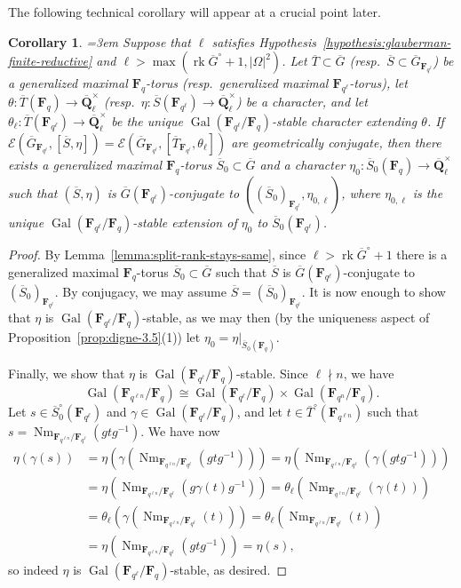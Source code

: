\documentclass[reqno]{amsart}
\numberwithin{equation}{subsection}
\newcommand{\F}{\mathbf{F}}
\newcommand{\Q}{\mathbf{Q}}
\newcommand{\Gal}{\operatorname{Gal}}
\newcommand{\ol}[1]{\overline{#1}}
\newcommand{\co}{\colon}
\newcommand\cE{\mathcal{E}}
\DeclareMathOperator{\Nm}{Nm}
\DeclareMathOperator{\rk}{rk}
\newtheorem{cor}[thm]{Corollary}
\theoremstyle{remark}
\numberwithin{equation}{subsection}
\numberwithin{figure}{subsection}
\begin{document}
The following technical corollary will appear at a crucial point later.

\begin{cor}\label{cor:glauberman-torus-character-conjugate}\emergencystretch=3em
    Suppose that $\ell$ satisfies Hypothesis~\ref{hypothesis:glauberman-finite-reductive} and $\ell > \max(\rk \ol G^\circ + 1, |\Omega|^2)$. Let $\ol T \subset \ol G$ (resp.\ $\ol S \subset \ol G_{\F_{q^\ell}}$) be a generalized maximal $\F_q$-torus (resp.\ generalized maximal $\F_{q^\ell}$-torus), let $\theta\co \ol T(\F_q) \to \ol\Q_\ell^\times$ (resp.\ $\eta\co \ol S(\F_{q^\ell}) \to \ol\Q_\ell^\times$) be a character, and let $\theta_\ell\co \ol T(\F_{q^\ell}) \to \ol\Q_\ell^\times$ be the unique $\Gal(\F_{q^\ell}/\F_q)$-stable character extending $\theta$. If $\cE(\ol G_{\F_{q^\ell}}, [\ol S, \eta]) = \cE(\ol G_{\F_{q^\ell}}, [\ol T_{\F_{q^\ell}}, \theta_\ell])$ are geometrically conjugate, then there exists a generalized maximal $\F_q$-torus $\ol S_0 \subset \ol G$ and a character $\eta_0\co \ol S_0(\F_q) \to \ol\Q_\ell^\times$ such that $(\ol S, \eta)$ is $\ol G(\F_{q^\ell})$-conjugate to $((\ol S_0)_{\F_{q^\ell}}, \eta_{0,\ell})$, where $\eta_{0,\ell}$ is the unique $\Gal(\F_{q^\ell}/\F_q)$-stable extension of $\eta_0$ to $\ol S_0(\F_{q^\ell})$.
\end{cor}

\begin{proof}
    By Lemma~\ref{lemma:split-rank-stays-same}, since $\ell > \rk \ol G^\circ + 1$ there is a generalized maximal $\F_q$-torus $\ol S_0 \subset \ol G$ such that $\ol S$ is $\ol G(\F_{q^\ell})$-conjugate to $(\ol S_0)_{\F_{q^\ell}}$. By conjugacy, we may assume $\ol S = (\ol S_0)_{\F_{q^\ell}}$. It is now enough to show that $\eta$ is $\Gal(\F_{q^\ell}/\F_q)$-stable, as we may then (by the uniqueness aspect of Proposition~\ref{prop:digne-3.5}(1)) let $\eta_0 = \eta|_{\ol S_0(\F_q)}$.

    Finally, we show that $\eta$ is $\Gal(\F_{q^\ell}/\F_q)$-stable. Since $\ell \nmid n$, we have
    \[
    \Gal(\F_{q^{\ell n}}/\F_q) \cong \Gal(\F_{q^\ell}/\F_q) \times \Gal(\F_{q^n}/\F_q).
    \]
    Let $s \in \ol S_0^\circ(\F_{q^\ell})$ and $\gamma \in \Gal(\F_{q^\ell}/\F_q)$, and let $t \in \ol T^\circ(\F_{q^{\ell n}})$ such that $s = \Nm_{\F_{q^{\ell n}}/\F_{q^\ell}}(gtg^{-1})$. We have now
    \begin{align*}
    \eta(\gamma(s)) &= \eta(\gamma(\Nm_{\F_{q^{\ell n}}/\F_{q^\ell}}(gtg^{-1}))) = \eta(\Nm_{\F_{q^{\ell n}}/\F_{q^\ell}}(\gamma(gtg^{-1}))) \\
        &= \eta(\Nm_{\F_{q^{\ell n}}/\F_{q^\ell}}(g\gamma(t)g^{-1})) = \theta_\ell(\Nm_{\F_{q^{\ell n}}/\F_{q^\ell}}(\gamma(t))) \\
        &= \theta_\ell(\gamma(\Nm_{\F_{q^{\ell n}}/\F_{q^\ell}}(t))) = \theta_\ell(\Nm_{\F_{q^{\ell n}}/\F_{q^\ell}}(t)) \\
        &= \eta(\Nm_{\F_{q^{\ell n}}/\F_{q^\ell}}(gtg^{-1})) = \eta(s),
    \end{align*}
    so indeed $\eta$ is $\Gal(\F_{q^\ell}/\F_q)$-stable, as desired.
\end{proof}
\end{document}
